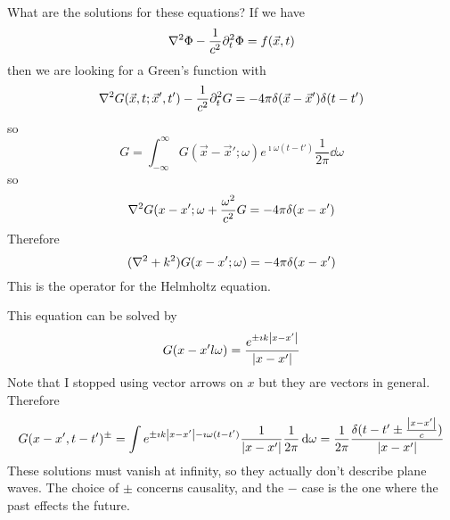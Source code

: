 \documentclass[a4paper,twoside,master.tex]{subfiles}
\begin{document}
What are the solutions for these equations? If we have
\begin{equation}
    \laplacian{\Phi} - \frac{1}{c^2} \partial_t^2 \Phi = f( \vec{x}, t)
\end{equation}
then we are looking for a Green's function with
\begin{equation}
    \laplacian{G( \vec{x},t; \vec{x}', t')} - \frac{1}{c^2} \partial_t^2 G = -4 \pi \delta( \vec{x} - \vec{x}') \delta(t-t')
\end{equation}
so
\begin{equation}
    G = \int_{- \infty}^{\infty} G( \vec{x} - \vec{x}'; \omega)e^{\imath\omega(t-t')} \frac{1}{2 \pi} \dd{\omega}
\end{equation}
so
\begin{equation}
    \laplacian{G(x-x';\omega} + \frac{\omega^2}{c^2} G = -4 \pi \delta(x-x')
\end{equation}
Therefore
\begin{equation}
    (\laplacian + k^2)G(x-x';\omega) = -4 \pi \delta(x-x')
\end{equation}
This is the operator for the Helmholtz equation.

This equation can be solved by
\begin{equation}
    G(x-x'l\omega) = \frac{e^{\pm\imath k \abs{x-x'}}}{\abs{x - x'}}
\end{equation}
Note that I stopped using vector arrows on $ x $ but they are vectors in general.
Therefore
\begin{equation}
    G(x-x',t-t')^{\pm} = \int e^{\pm\imath k \abs{x-x'} - \imath \omega (t-t')} \frac{1}{\abs{x-x'}} \frac{1}{2 \pi} \dd{\omega} = \frac{1}{2 \pi} \frac{\delta(t-t'\pm \frac{\abs{x-x'}}{c})}{\abs{x-x'}}
\end{equation}
These solutions must vanish at infinity, so they actually don't describe plane waves. The choice of $ \pm $ concerns causality, and the $ - $ case is the one where the past effects the future.
\end{document}
